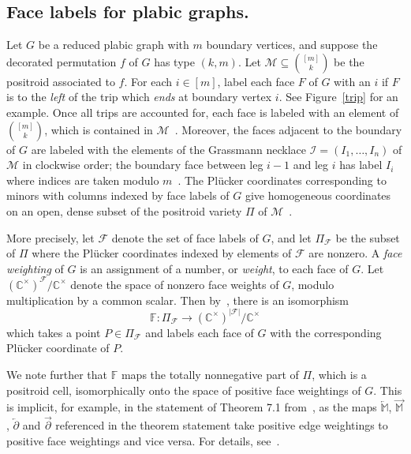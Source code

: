 \documentclass[ALCO,ThmDefs,Unicode,epreuves]{cedram}
\begin{document}
\subsection{Face labels for plabic graphs.}
\label{faces}

Let $G$ be a reduced plabic graph with $m$ boundary vertices, and suppose the decorated permutation $f$ of $G$ has type $(k,m)$. 
Let $\mathcal{M} \subseteq \binom{[m]}{k}$ be the positroid associated to $f$. 
For each $i \in [m]$, label each face $F$ of $G$ with an $i$ if $F$ is to the \emph{left} of the trip which \emph{ends} at boundary vertex $i$. See Figure~\ref{trip} for an example. Once all trips are accounted for, each face is labeled with an element of $\binom{[m]}{k}$, which is contained in $\mathcal{M}$~\cite{JS06}. Moreover, the faces adjacent to the boundary of $G$ are labeled with the elements of the Grassmann necklace $\mathcal{I}=(I_1,\ldots,I_n)$ of $\mathcal{M}$ in clockwise order; the boundary face between leg $i-1$ and leg $i$ has label $I_i$ where indices are taken modulo $m$~\cite{OPS15}. The Pl{\"u}cker coordinates corresponding to minors with columns indexed by face labels of $G$ give homogeneous coordinates on an open, dense subset of the positroid variety $\Pi$ of $\mathcal{M}$~\cite{MS17}.

More precisely, let $\mathcal{F}$ denote the set of face labels of $G$, and let $\Pi_{\mathcal{F}}$ be the subset of $\Pi$ where the Pl{\"u}cker coordinates indexed by elements of $\mathcal{F}$ are nonzero. A \emph{face weighting} of $G$ is an assignment of a number, or \emph{weight}, to each face of $G$. Let $(\mathbb{C}^{\times})^{\mathcal{F}}/\mathbb{C}^{\times}$ denote the space of nonzero face weights of $G$, modulo multiplication by a common scalar. Then by~\cite[Theorem 7.1]{MS17}, there is an isomorphism
\[\mathbb{F}: \Pi_{\mathcal{F}} \rightarrow (\mathbb{C}^{\times})^{|\mathcal{F}|}/\mathbb{C}^{\times}\]
which takes a point $P \in \Pi_{\mathcal{F}}$ and labels each face of $G$ with the corresponding Pl{\"u}cker coordinate of $P$. 

We note further that $\mathbb{F}$ maps the totally nonnegative part of $\Pi$, which is a positroid cell, isomorphically onto the space of positive face weightings of $G$. This is implicit, for example, in the statement of Theorem 7.1 from~\cite{MS17}, as the maps $\overleftarrow{\mathbb{M}}$, $\overrightarrow{\mathbb{M}}$, $\overleftarrow{\partial}$ and $\overrightarrow{\partial}$ referenced in the theorem statement take positive edge weightings to positive face weightings and vice versa. For details, see~\cite[Section 5.3--5.4]{MS17}.
\end{document}
